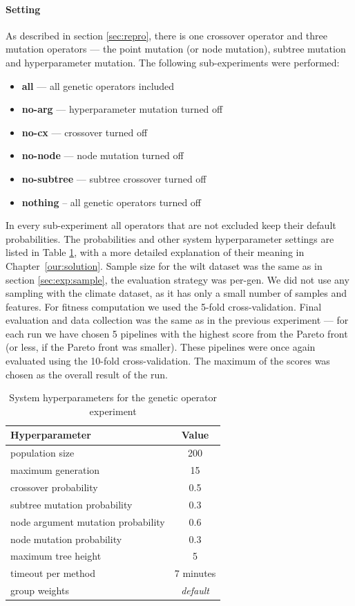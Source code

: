 \paragraph{Setting}

As described in section \ref{sec:repro}, there is one crossover operator and
three mutation operators --- the point mutation (or node mutation), subtree
mutation and hyperparameter
mutation. The following sub-experiments were performed:
\begin{itemize}
\setlength\itemsep{0.3em}
\item \textbf{all} --- all genetic operators included
\item \textbf{no-arg} --- hyperparameter mutation turned off
\item \textbf{no-cx} --- crossover turned off
\item \textbf{no-node} --- node mutation turned off
\item \textbf{no-subtree} --- subtree crossover turned off
\item \textbf{nothing} -- all genetic operators turned off
\end{itemize}
In every sub-experiment all operators that are not excluded keep their default
probabilities. The probabilities and other system hyperparameter
settings are listed in Table \ref{tab04:exp2:setting}, with a more detailed
explanation of their meaning in Chapter~\ref{our:solution}.
Sample size for the wilt dataset was the same as in section
\ref{sec:exp:sample}, the evaluation strategy was per-gen. We did not use any
sampling with the climate dataset, as it has only a small number of samples and features.
For fitness computation we used the 5-fold cross-validation. Final evaluation
and data collection was the same as in the previous experiment --- for each run we
have chosen 5 pipelines with the highest score from the Pareto front
(or less, if the Pareto front was smaller). These pipelines were once again
evaluated using the 10-fold cross-validation. The maximum of the scores was chosen
as the overall result of the run.

\begin{table}[ht]
\centering
\caption{System hyperparameters for the genetic operator experiment}\label{tab04:exp2:setting}
\begin{tabular}{l c}
\toprule
\textbf{\upshape Hyperparameter} & \textbf{Value} \\
\midrule
population size & 200 \\
maximum generation & 15 \\
crossover probability & 0.5 \\
subtree mutation probability & 0.3 \\
node argument mutation probability & 0.6 \\
node mutation probability & 0.3 \\
maximum tree height & 5 \\
timeout per method  & 7 minutes \\
group weights & \textit{default} \\
\bottomrule

\end{tabular}

\end{table}

